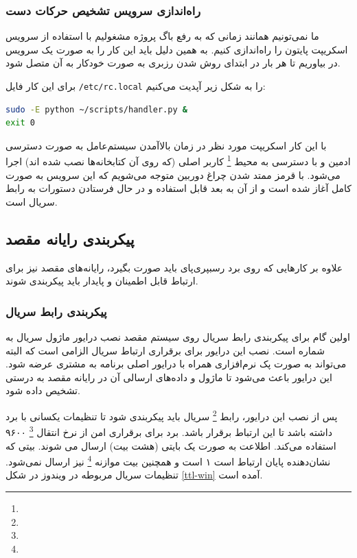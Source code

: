 \documentclass{article}
\begin{document}
\subsubsection{راه‌اندازی سرویس تشخیص حرکات دست}
ما نمی‌تونیم همانند زمانی که به رفع باگ پروژه مشغولیم با استفاده از سرویس 
اسکریپت پایتون را راه‌اندازی کنیم. به همین دلیل باید این کار را به صورت یک سرویس در بیاوریم
تا هر بار در ابتدای روش شدن رزبری به صورت خودکار به آن متصل شود.

برای این کار فایل
\verb~/etc/rc.local~
را به شکل زیر آپدیت می‌کنیم:
\begin{latin}
\begin{lstlisting}[language=bash]
sudo -E python ~/scripts/handler.py &
exit 0
\end{lstlisting}	
\end{latin}

با این کار اسکریپت مورد نظر در زمان بالاآمدن سیستم‌عامل به صورت دسترسی ادمین و با دسترسی به
محیط \footnote{} کاربر اصلی (که روی آن کتابخانه‌ها نصب شده اند) اجرا می‌شود.
با قرمز ممتد شدن چراغ دوربین متوجه می‌شویم که این سرویس به صورت کامل آغاز شده است و از آن به بعد قابل استفاده و در حال فرستادن دستورات به رابط سریال است.

\subsection{پیکربندی رایانه مقصد}
علاوه بر کارهایی که روی برد رسبپری‌پای باید صورت بگیرد، رایانه‌های مقصد نیز برای ارتباط قابل اطمینان و پایدار باید پیکربندی شوند.
\subsubsection{پیکربندی رابط سریال}
اولین گام برای پیکر‌بندی رابط سریال روی سیستم مقصد نصب درایور ماژول سریال به شماره
 \cite{ttl} است. نصب این درایور برای برقراری ارتباط سریال الزامی است که البته می‌تواند
به صورت پک نرم‌افزاری همراه با درایور اصلی برنامه به مشتری عرضه شود. این درایور باعث می‌شود
تا ماژول و داده‌های ارسالی آن در رایانه مقصد به درستی تشخیص داده شود.

پس از نصب این درایور، رابط \footnote{} سریال باید پیکر‌بندی شود تا تنظیمات
یکسانی با برد داشته باشد تا این ارتباط برقرار باشد. برد برای برقراری امن از نرخ انتقال
\footnote{} ۹۶۰۰ استفاده می‌کند. اطلاعت به صورت یک بایتی (هشت بیت) ارسال می شوند. بیتی که نشان‌دهنده پایان ارتباط است ۱ است و همچنین بیت موازنه \footnote{} نیز ارسال نمی‌شود. تنظیمات سریال مربوطه در ویندوز در شکل \ref{ttl-win} آمده است.
\end{document}

